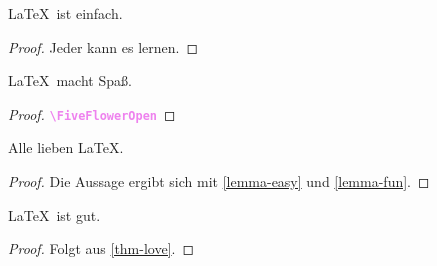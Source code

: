 \documentclass{scrartcl}
\begin{document}
  \thispagestyle{empty}

  \raggedright

  \begin{lemma}\label{lemma-easy}
    \LaTeX\ ist einfach.
  \end{lemma}

  \begin{proof}
    Jeder kann es lernen.
  \end{proof}

  \begin{lemma}\label{lemma-fun}
    \LaTeX\ macht Spaß.
  \end{lemma}

  \begin{proof}
    \textcolor{violet}{\texttt{\bfseries\textbackslash FiveFlowerOpen}}\textcolor{orange}{\FiveFlowerOpen}
  \end{proof}

  \begin{theorem}\label{thm-love}
    Alle lieben \LaTeX.
  \end{theorem}

  \begin{proof}
    Die Aussage ergibt sich mit \autoref{lemma-easy} und \autoref{lemma-fun}.
  \end{proof}

  \begin{corollary}
    \LaTeX\ ist gut.
  \end{corollary}

  \begin{proof}
    Folgt aus \autoref{thm-love}.
  \end{proof}
\end{document}
